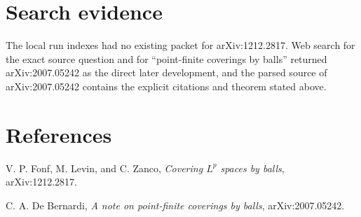 \documentclass[11pt]{article}
\begin{document}
\section*{Search evidence}

The local run indexes had no existing packet for arXiv:1212.2817.  Web search
for the exact source question and for ``point-finite coverings by balls''
returned arXiv:2007.05242 as the direct later development, and the parsed
source of arXiv:2007.05242 contains the explicit citations and theorem stated
above.

\section*{References}

V. P. Fonf, M. Levin, and C. Zanco, \emph{Covering \(L^p\) spaces by balls},
arXiv:1212.2817.

C. A. De Bernardi, \emph{A note on point-finite coverings by balls},
arXiv:2007.05242.
\end{document}
